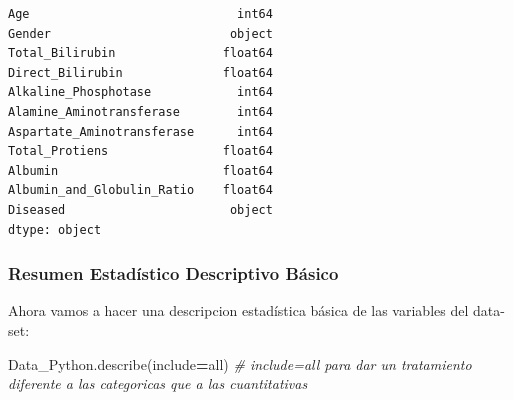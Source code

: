 \documentclass[
  11pt,
  a4paper,
]{article}
\newenvironment{Shaded}{\begin{snugshade}}{\end{snugshade}}
\newcommand{\CommentTok}[1]{\textcolor[rgb]{0.56,0.35,0.01}{\textit{#1}}}
\newcommand{\NormalTok}[1]{#1}
\newcommand{\OperatorTok}[1]{\textcolor[rgb]{0.81,0.36,0.00}{\textbf{#1}}}
\newcommand{\StringTok}[1]{\textcolor[rgb]{0.31,0.60,0.02}{#1}}
\begin{document}
\begin{verbatim}
Age                             int64
Gender                         object
Total_Bilirubin               float64
Direct_Bilirubin              float64
Alkaline_Phosphotase            int64
Alamine_Aminotransferase        int64
Aspartate_Aminotransferase      int64
Total_Protiens                float64
Albumin                       float64
Albumin_and_Globulin_Ratio    float64
Diseased                       object
dtype: object
\end{verbatim}

\newpage

\hypertarget{resumen-estaduxedstico-descriptivo-buxe1sico}{%
\subsubsection{\texorpdfstring{Resumen Estadístico Descriptivo Básico
}{Resumen Estadístico Descriptivo Básico }}\label{resumen-estaduxedstico-descriptivo-buxe1sico}}

Ahora vamos a hacer una descripcion estadística básica de las variables
del data-set:

\begin{Shaded}
\begin{Highlighting}[]
\NormalTok{Data\_Python.describe(include}\OperatorTok{=}\StringTok{\textquotesingle{}all\textquotesingle{}}\NormalTok{) }\CommentTok{\# include=\textquotesingle{}all\textquotesingle{} para dar un tratamiento diferente a las categoricas que a las cuantitativas}
\end{Highlighting}
\end{Shaded}
\end{document}
